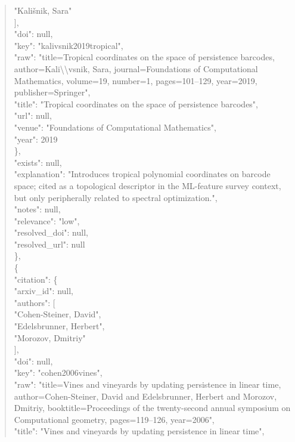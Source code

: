 \documentclass[11pt]{article}
\begin{document}
\begin{quote}
          "Kališnik, Sara"\\
        ],\\
        "doi": null,\\
        "key": "kalivsnik2019tropical",\\
        "raw": "title=Tropical coordinates on the space of persistence barcodes, author=Kali\textbackslash{}\textbackslash{}vsnik, Sara, journal=Foundations of Computational Mathematics, volume=19, number=1, pages=101--129, year=2019, publisher=Springer",\\
        "title": "Tropical coordinates on the space of persistence barcodes",\\
        "url": null,\\
        "venue": "Foundations of Computational Mathematics",\\
        "year": 2019\\
      \},\\
      "exists": null,\\
      "explanation": "Introduces tropical polynomial coordinates on barcode space; cited as a topological descriptor in the ML-feature survey context, but only peripherally related to spectral optimization.",\\
      "notes": null,\\
      "relevance": "low",\\
      "resolved\_doi": null,\\
      "resolved\_url": null\\
    \},\\
    \{\\
      "citation": \{\\
        "arxiv\_id": null,\\
        "authors": [\\
          "Cohen-Steiner, David",\\
          "Edelsbrunner, Herbert",\\
          "Morozov, Dmitriy"\\
        ],\\
        "doi": null,\\
        "key": "cohen2006vines",\\
        "raw": "title=Vines and vineyards by updating persistence in linear time, author=Cohen-Steiner, David and Edelsbrunner, Herbert and Morozov, Dmitriy, booktitle=Proceedings of the twenty-second annual symposium on Computational geometry, pages=119--126, year=2006",\\
        "title": "Vines and vineyards by updating persistence in linear time",\\

\end{quote}
\end{document}
